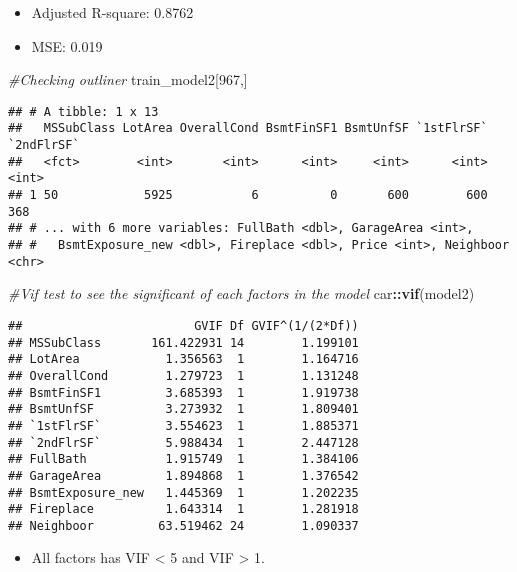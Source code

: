 \documentclass[]{article}
\newenvironment{Shaded}{\begin{snugshade}}{\end{snugshade}}
\newcommand{\CommentTok}[1]{\textcolor[rgb]{0.56,0.35,0.01}{\textit{#1}}}
\newcommand{\DecValTok}[1]{\textcolor[rgb]{0.00,0.00,0.81}{#1}}
\newcommand{\KeywordTok}[1]{\textcolor[rgb]{0.13,0.29,0.53}{\textbf{#1}}}
\newcommand{\NormalTok}[1]{#1}
\newcommand{\OperatorTok}[1]{\textcolor[rgb]{0.81,0.36,0.00}{\textbf{#1}}}
\providecommand{\tightlist}{%
  \setlength{\itemsep}{0pt}\setlength{\parskip}{0pt}}
\begin{document}
\begin{itemize}
\tightlist
\item
  Adjusted R-square: 0.8762
\item
  MSE: 0.019
\end{itemize}

\begin{Shaded}
\begin{Highlighting}[]
\CommentTok{#Checking outliner}
\NormalTok{train_model2[}\DecValTok{967}\NormalTok{,]}
\end{Highlighting}
\end{Shaded}

\begin{verbatim}
## # A tibble: 1 x 13
##   MSSubClass LotArea OverallCond BsmtFinSF1 BsmtUnfSF `1stFlrSF` `2ndFlrSF`
##   <fct>        <int>       <int>      <int>     <int>      <int>      <int>
## 1 50            5925           6          0       600        600        368
## # ... with 6 more variables: FullBath <dbl>, GarageArea <int>,
## #   BsmtExposure_new <dbl>, Fireplace <dbl>, Price <int>, Neighboor <chr>
\end{verbatim}

\begin{Shaded}
\begin{Highlighting}[]
\CommentTok{#Vif test to see the significant of each factors in the model }
\NormalTok{car}\OperatorTok{::}\KeywordTok{vif}\NormalTok{(model2)}
\end{Highlighting}
\end{Shaded}

\begin{verbatim}
##                        GVIF Df GVIF^(1/(2*Df))
## MSSubClass       161.422931 14        1.199101
## LotArea            1.356563  1        1.164716
## OverallCond        1.279723  1        1.131248
## BsmtFinSF1         3.685393  1        1.919738
## BsmtUnfSF          3.273932  1        1.809401
## `1stFlrSF`         3.554623  1        1.885371
## `2ndFlrSF`         5.988434  1        2.447128
## FullBath           1.915749  1        1.384106
## GarageArea         1.894868  1        1.376542
## BsmtExposure_new   1.445369  1        1.202235
## Fireplace          1.643314  1        1.281918
## Neighboor         63.519462 24        1.090337
\end{verbatim}

\begin{itemize}
\tightlist
\item
  All factors has VIF \textless{} 5 and VIF \textgreater{} 1.
\end{itemize}
\end{document}
